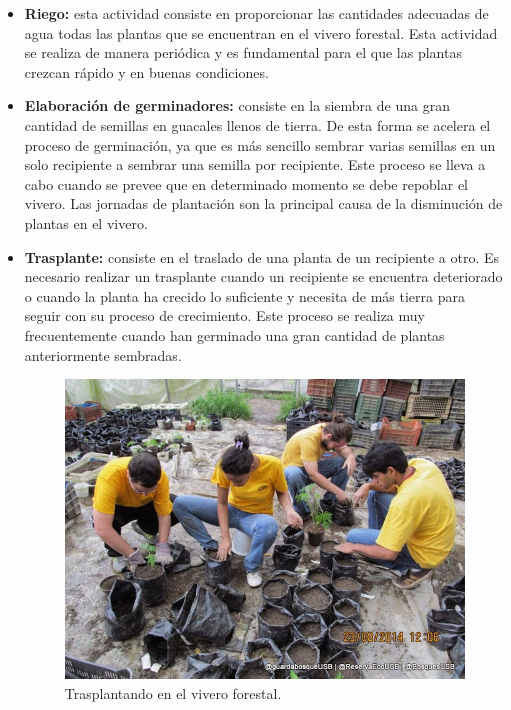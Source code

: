 \begin{itemize}

\item \textbf{Riego:} esta actividad consiste en proporcionar las cantidades adecuadas de agua todas las plantas que se encuentran en el vivero forestal. Esta actividad se realiza de manera periódica y es fundamental para el que las plantas crezcan rápido y en buenas condiciones.

\item \textbf{Elaboración de germinadores:} consiste en la siembra de una gran cantidad de semillas en guacales llenos de tierra. De esta forma se acelera el proceso de germinación, ya que es más sencillo sembrar varias semillas en un solo recipiente a sembrar una semilla por recipiente. Este proceso se lleva a cabo cuando se prevee que en determinado momento se debe repoblar el vivero. Las jornadas de plantación son la principal causa de la disminución de plantas en el vivero.

\item \textbf{Trasplante:} consiste en el traslado de una planta de un recipiente a otro. Es necesario realizar un trasplante cuando un recipiente se encuentra deteriorado o cuando la planta ha crecido lo suficiente y necesita de más tierra para seguir con su proceso de crecimiento. Este proceso se realiza muy frecuentemente cuando han germinado una gran cantidad de plantas anteriormente sembradas.

\begin{figure}[H]
    \centering
    \includegraphics[scale=0.5]{imagenes/foto3}
    \caption{Trasplantando en el vivero forestal.}
    \label{foto3}
\end{figure}


\end{itemize}
